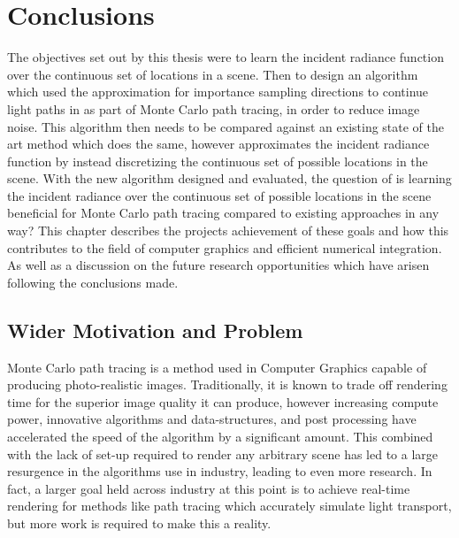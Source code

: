 \documentclass[../dissertation.tex]{subfiles}
\begin{document}
\chapter{Conclusions}
\label{chap:conclusion}

The objectives set out by this thesis were to learn the incident radiance function over the continuous set of locations in a scene. Then to design an algorithm which used the  approximation for importance sampling directions to continue light paths in as part of Monte Carlo path tracing, in order to reduce image noise. This algorithm then needs to be compared against an existing state of the art method which does the same, however approximates the incident radiance function by instead discretizing the continuous set of possible locations in the scene. With the new algorithm designed and evaluated, the question of is learning the incident radiance over the continuous set of possible locations in the scene beneficial for Monte Carlo path tracing compared to existing approaches in any way? This chapter describes the projects achievement of these goals and how this contributes to the field of computer graphics and efficient numerical integration. As well as  a discussion on the future research opportunities which have arisen following the conclusions made.

\section*{Wider Motivation and Problem}

Monte Carlo path tracing is a method used in Computer Graphics capable of producing photo-realistic images. Traditionally, it is known to trade off rendering time for the superior image quality it can produce, however increasing compute power, innovative algorithms and data-structures, and post processing have accelerated the speed of the algorithm by a significant amount. This combined with the lack of set-up required to render any arbitrary scene has led to a large resurgence in the algorithms use in industry, leading to even more research. In fact, a larger goal held across industry at this point is to achieve real-time rendering for methods like path tracing which accurately simulate light transport, but more work is required to make this a reality.\\
\end{document}
